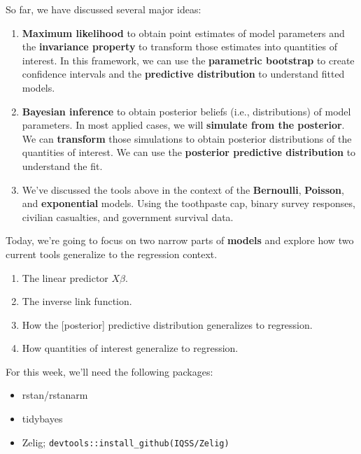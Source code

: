 \documentclass[
]{book}
\providecommand{\tightlist}{%
  \setlength{\itemsep}{0pt}\setlength{\parskip}{0pt}}
\begin{document}
So far, we have discussed several major ideas:

\begin{enumerate}
\def\labelenumi{\arabic{enumi}.}
\tightlist
\item
  \textbf{Maximum likelihood} to obtain point estimates of model parameters and the \textbf{invariance property} to transform those estimates into quantities of interest. In this framework, we can use the \textbf{parametric bootstrap} to create confidence intervals and the \textbf{predictive distribution} to understand fitted models.
\item
  \textbf{Bayesian inference} to obtain posterior beliefs (i.e., distributions) of model parameters. In most applied cases, we will \textbf{simulate from the posterior}. We can \textbf{transform} those simulations to obtain posterior distributions of the quantities of interest. We can use the \textbf{posterior predictive distribution} to understand the fit.
\item
  We've discussed the tools above in the context of the \textbf{Bernoulli}, \textbf{Poisson}, and \textbf{exponential} models. Using the toothpaste cap, binary survey responses, civilian casualties, and government survival data.
\end{enumerate}

Today, we're going to focus on two narrow parts of \textbf{models} and explore how two current tools generalize to the regression context.

\begin{enumerate}
\def\labelenumi{\arabic{enumi}.}
\tightlist
\item
  The linear predictor \(X\beta\).
\item
  The inverse link function.
\item
  How the {[}posterior{]} predictive distribution generalizes to regression.
\item
  How quantities of interest generalize to regression.
\end{enumerate}

For this week, we'll need the following packages:

\begin{itemize}
\tightlist
\item
  rstan/rstanarm
\item
  tidybayes
\item
  Zelig; \texttt{devtools::install\_github(\textquotesingle{}IQSS/Zelig\textquotesingle{})}
\end{itemize}
\end{document}
